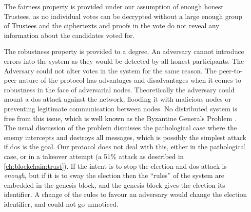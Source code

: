 The fairness property is provided under our assumption of enough honest Trustees, as no individual votes can be decrypted without a large enough group of Trustees and the ciphertexts and proofs in the vote do not reveal any information about the candidates voted for.

The robustness property is provided to a degree. An adversary cannot introduce errors into the system as they would be detected by all honest participants. The Adversary could not alter votes in the system for the same reason. The peer-to-peer nature of the protocol has advantages and disadvantages when it comes to robustness in the face of adversarial nodes. Theoretically the adversary could mount a \gls{dos} attack against the network, flooding it with malicious nodes or preventing legitimate communication between nodes. No distributed system is free from this issue, which is well known as the Byzantine Generals Problem \cite{lamportByzantineGeneralsProblem1982}. The usual discussion of the problem dismisses the pathological case where the enemy intercepts and destroys all messages, which is possibly the simplest attack if \gls{dos} is the goal. Our protocol does not deal with this, either in the pathological case, or in a takeover attempt (a 51\% attack as described in \autoref{ch:blockchain:trust}). If the intent is to stop the election and \gls{dos} attack is \emph{enough}, but if it is to sway the election then the ``rules'' of the system are embedded in the genesis block, and the genesis block gives the election its identifier. A change of the rules to favour an adversary would change the election identifier, and could not go unnoticed.


